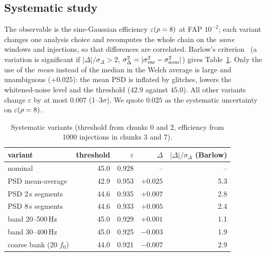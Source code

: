 \subsection{Systematic study}
The observable is the sine-Gaussian efficiency $\varepsilon(\rho=8)$ at FAP $10^{-2}$; each variant changes one analysis choice and recomputes the whole chain on the \emph{same} windows and injections, so that differences are correlated.
Barlow's criterion~\cite{Barlow} (a variation is significant if $|\Delta|/\sigma_\Delta>2$, $\sigma_\Delta^2=|\sigma_{\rm var}^2-\sigma_{\rm nom}^2|$) gives Table~\ref{tab:sys}.
Only the use of the \emph{mean} instead of the median in the Welch average is large and unambiguous ($+0.025$): the mean PSD is inflated by glitches, lowers the whitened-noise level and the threshold ($42.9$ against $45.0$). All other variants change $\varepsilon$ by at most $0.007$ (1--3$\sigma$).
We quote $0.025$ as the systematic uncertainty on $\varepsilon(\rho=8)$.
\begin{table}[h]\centering\small
\begin{tabular}{lrrrr}
\toprule
variant & threshold & $\varepsilon$ & $\Delta$ & $|\Delta|/\sigma_\Delta$ (Barlow)\\
\midrule
nominal & 45.0 & 0.928 & -- & --\\
PSD mean-average & 42.9 & 0.953 & $+0.025$ & 5.3\\
PSD 2\,s segments & 44.6 & 0.935 & $+0.007$ & 2.8\\
PSD 8\,s segments & 44.6 & 0.933 & $+0.005$ & 2.4\\
band 20--500\,Hz & 45.0 & 0.929 & $+0.001$ & 1.1\\
band 30--400\,Hz & 45.0 & 0.925 & $-0.003$ & 1.9\\
coarse bank (20 $f_0$) & 44.0 & 0.921 & $-0.007$ & 2.9\\
\bottomrule
\end{tabular}
\caption{Systematic variants (threshold from chunks 0 and 2, efficiency from 1000 injections in chunks 3 and 7).}\label{tab:sys}
\end{table}

